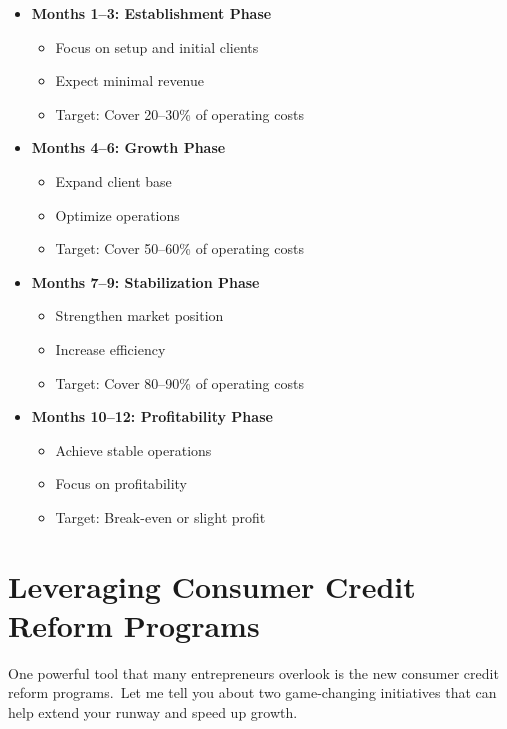 \begin{tcolorbox}[colback=white,colframe=primarydark,title=\textbf{12-Month Revenue Framework}]
\begin{itemize}
    \item \textbf{Months 1--3: Establishment Phase}
    \begin{itemize}
        \item Focus on setup and initial clients
        \item Expect minimal revenue
        \item Target: Cover 20--30\% of operating costs
    \end{itemize}

    \item \textbf{Months 4--6: Growth Phase}
    \begin{itemize}
        \item Expand client base
        \item Optimize operations
        \item Target: Cover 50--60\% of operating costs
    \end{itemize}

    \item \textbf{Months 7--9: Stabilization Phase}
    \begin{itemize}
        \item Strengthen market position
        \item Increase efficiency
        \item Target: Cover 80--90\% of operating costs
    \end{itemize}

    \item \textbf{Months 10--12: Profitability Phase}
    \begin{itemize}
        \item Achieve stable operations
        \item Focus on profitability
        \item Target: Break-even or slight profit
    \end{itemize}
\end{itemize}
\end{tcolorbox}

\section{Leveraging Consumer Credit Reform Programs}\label{sec:consumer-credit}

One powerful tool that many entrepreneurs overlook is the new consumer credit reform programs.\ Let me tell you about two game-changing initiatives that can help extend your runway and speed up growth.

